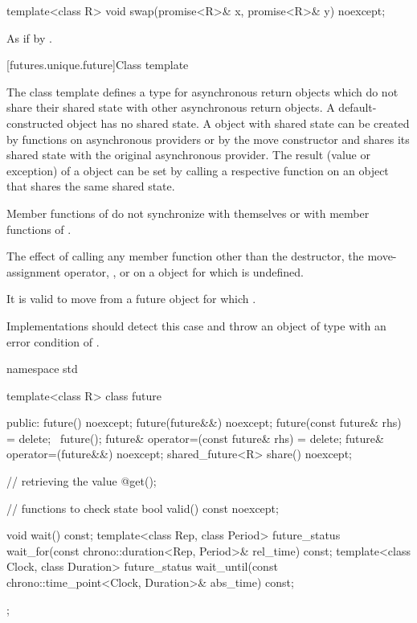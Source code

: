 %
\begin{itemdecl}
template<class R>
  void swap(promise<R>& x, promise<R>& y) noexcept;
\end{itemdecl}

\begin{itemdescr}
\pnum
\effects As if by .
\end{itemdescr}

[futures.unique.future]{Class template }

\pnum
The class template  defines a type for asynchronous return objects which
do not share their shared state with other asynchronous return objects.
A default-constructed  object has no
shared state. A  object with shared state can be created by
functions on asynchronous providers or by the move constructor
and shares its shared state with
the original asynchronous provider. The result (value or exception) of
a  object
can be
set by
calling a respective function on an
object that shares the same
shared state.

\pnum
\begin{note} Member functions of  do not synchronize with themselves or with
member functions of . \end{note}

\pnum
The effect of calling any member function other than the destructor, the
move-assignment operator, , or  on a  object for which
is undefined.
\begin{note} It is valid to move from a future object for which .
\end{note}
\begin{note} Implementations should detect this case and throw an object of type
 with an error condition of . \end{note}

%
\begin{codeblock}
namespace std {
  template<class R>
  class future {
  public:
    future() noexcept;
    future(future&&) noexcept;
    future(const future& rhs) = delete;
    ~future();
    future& operator=(const future& rhs) = delete;
    future& operator=(future&&) noexcept;
    shared_future<R> share() noexcept;

    // retrieving the value
    @\seebelow@ get();

    // functions to check state
    bool valid() const noexcept;

    void wait() const;
    template<class Rep, class Period>
      future_status wait_for(const chrono::duration<Rep, Period>& rel_time) const;
    template<class Clock, class Duration>
      future_status wait_until(const chrono::time_point<Clock, Duration>& abs_time) const;
  };
}
\end{codeblock}

